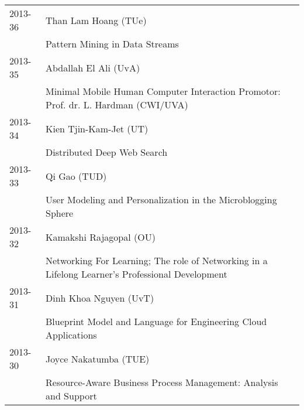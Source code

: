 \begin{longtable}{p{1.25cm}p{10.75cm}}
2013-36 & Than Lam Hoang (TUe) \\& Pattern Mining in Data Streams \\

2013-35 & Abdallah El Ali (UvA) \\& Minimal Mobile Human Computer Interaction \newline Promotor: Prof. dr. L. Hardman (CWI/UVA) \\

2013-34 & Kien Tjin-Kam-Jet (UT) \\& Distributed Deep Web Search \\
2013-33 & Qi Gao (TUD) \\& User Modeling and Personalization in the Microblogging Sphere \\
2013-32 & Kamakshi Rajagopal (OU) \\& Networking For Learning; The role of Networking in a Lifelong Learner's Professional Development \\
2013-31 & Dinh Khoa Nguyen (UvT) \\& Blueprint Model and Language for Engineering Cloud Applications \\
2013-30 & Joyce Nakatumba (TUE) \\& Resource-Aware Business Process Management: Analysis and Support \\


\end{longtable}
